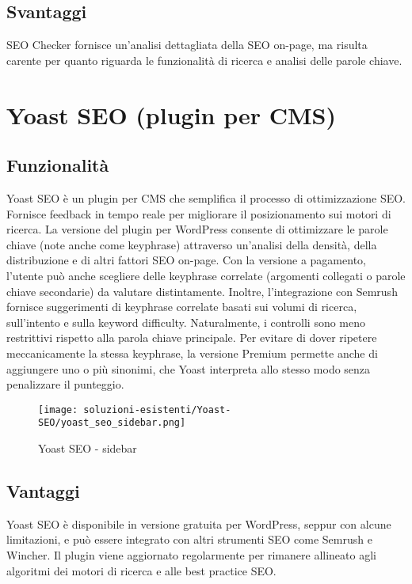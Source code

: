 \subsection{Svantaggi}
\par SEO Checker fornisce un'analisi dettagliata della SEO on-page, ma risulta carente per quanto riguarda le funzionalità di ricerca e analisi delle parole chiave.

\section{Yoast SEO (plugin per CMS)}

\subsection{Funzionalità}
\par Yoast SEO è un plugin per CMS che semplifica il processo di ottimizzazione SEO. Fornisce feedback in tempo reale per migliorare il posizionamento sui motori di ricerca. La versione del plugin per WordPress consente di ottimizzare le parole chiave (note anche come keyphrase) attraverso un’analisi della densità, della distribuzione e di altri fattori SEO on-page. Con la versione a pagamento, l’utente può anche scegliere delle keyphrase correlate (argomenti collegati o parole chiave secondarie) da valutare distintamente. Inoltre, l’integrazione con Semrush fornisce suggerimenti di keyphrase correlate basati sui volumi di ricerca, sull’intento e sulla keyword difficulty. Naturalmente, i controlli sono meno restrittivi rispetto alla parola chiave principale. Per evitare di dover ripetere meccanicamente la stessa keyphrase, la versione Premium permette anche di aggiungere uno o più sinonimi, che Yoast interpreta allo stesso modo senza penalizzare il punteggio.

\begin{figure}[H]
    \centering 
    \texttt{[image: soluzioni-esistenti/Yoast-SEO/yoast\_seo\_sidebar.png]} 
    \caption{Yoast SEO - sidebar}
\end{figure}

\subsection{Vantaggi}
\par Yoast SEO è disponibile in versione gratuita per WordPress, seppur con alcune limitazioni, e può essere integrato con altri strumenti SEO come Semrush e Wincher. Il plugin viene aggiornato regolarmente per rimanere allineato agli algoritmi dei motori di ricerca e alle best practice SEO.

